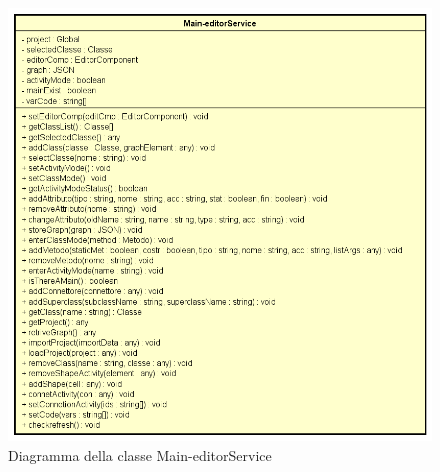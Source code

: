\begin{figure}[h!]
	\centering
	\includegraphics[scale=0.8]{res/sections/SpecificaFrontEnd/Services/Disegnetti/main-editor.png}
	\caption{Diagramma della classe Main-editorService}
\end{figure}

